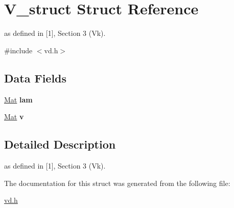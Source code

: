 \hypertarget{structV__struct}{}\section{V\+\_\+struct Struct Reference}
\label{structV__struct}


as defined in \mbox{[}1\mbox{]}, Section 3 (Vk).  




{\ttfamily \#include $<$vd.\+h$>$}

\subsection*{Data Fields}
\begin{DoxyCompactItemize}
\item 
\mbox{\label{structV__struct_a56d1655953ba5bee519bd62d992abfff}} 
\mbox{\hyperlink{typedefs_8cpp_a9fa28c1f74e909474857584f5c7b0088}{Mat}} {\bfseries lam}
\item 
\mbox{\label{structV__struct_aa78c83185af94c1df09f59a689881cd9}} 
\mbox{\hyperlink{typedefs_8cpp_a9fa28c1f74e909474857584f5c7b0088}{Mat}} {\bfseries v}
\end{DoxyCompactItemize}


\subsection{Detailed Description}
as defined in \mbox{[}1\mbox{]}, Section 3 (Vk). 

The documentation for this struct was generated from the following file\+:\begin{DoxyCompactItemize}
\item 
\mbox{\hyperlink{vd_8h}{vd.\+h}}\end{DoxyCompactItemize}

